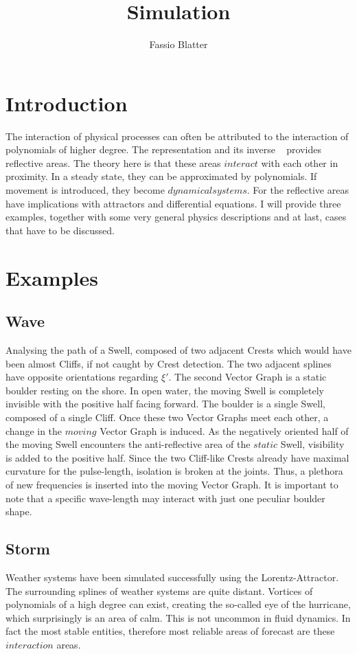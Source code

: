 \documentclass{report}
\begin{document}
\title{Simulation}
\author{Fassio Blatter}
\maketitle

\chapter{Introduction}
The interaction of physical processes can often be attributed to the interaction of polynomials of higher degree. The representation and its inverse ~\cite[Spline\_Axioms.tex]{Axioms} provides reflective areas. The theory here is that these areas $interact$ with each other in proximity. In a steady state, they can be approximated by polynomials. If movement is introduced, they become $dynamical systems$. For the reflective areas have implications with attractors and differential equations. I will provide three examples, together with some very general physics descriptions and at last, cases that have to be discussed.

\chapter{Examples}
\section{Wave}
Analysing the path of a Swell, composed of two adjacent Crests which would have been almost Cliffs, if not caught by Crest detection. The two adjacent splines have opposite orientations regarding $\xi'$. The second Vector Graph is a static boulder resting on the shore. In open water, the moving Swell is completely invisible with the positive half facing forward. The boulder is a single Swell, composed of a single Cliff. Once these two Vector Graphs meet each other, a change in the $moving$ Vector Graph is induced. As the negatively oriented half of the moving Swell encounters the anti-reflective area of the $static$ Swell, visibility is added to the positive half. Since the two Cliff-like Crests already have maximal curvature for the pulse-length, isolation is broken at the joints. Thus, a plethora of new frequencies is inserted into the moving Vector Graph. It is important to note that a specific wave-length may interact with just one peculiar boulder shape.
\section{Storm}
Weather systems have been simulated successfully using the Lorentz-Attractor. The surrounding splines of weather systems are quite distant. Vortices of polynomials of a high degree can exist, creating the so-called eye of the hurricane, which surprisingly is an area of calm. This is not uncommon in fluid dynamics. In fact the most stable entities, therefore most reliable areas of forecast are these $interaction$ areas.
\end{document}

